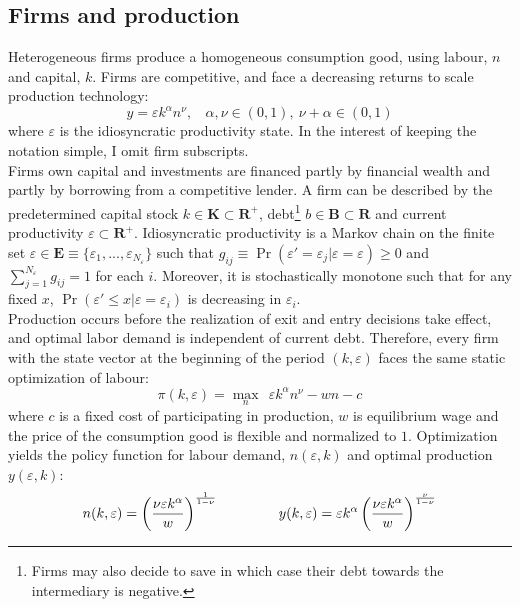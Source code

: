 \documentclass[12pt]{article}
\begin{document}
\subsection{Firms and production \label{sec:production}}
Heterogeneous firms produce a homogeneous consumption good, using labour, $n$ and capital, $k$. Firms are competitive, and face a decreasing returns to scale production technology:
\begin{equation} \label{eq:prodf}
y = \varepsilon k^{\alpha}n^{\nu}, \ \ \ \ \alpha,\nu \in (0,1),  \ \nu + \alpha \in (0,1)
\end{equation}  
where $\varepsilon$ is the idiosyncratic productivity state. In the interest of keeping the notation simple, I omit firm subscripts. \vspace{3mm} \\
Firms own capital and investments are financed partly by financial wealth and partly by borrowing from a competitive lender. A firm can be described by the predetermined capital stock $k \in \mathbf{K} \subset \mathbf{R^{+}}$, debt\footnote{Firms may also decide to save in which case their debt towards the intermediary is negative.} $b \in \mathbf{B} \subset \mathbf{R}$ and current productivity $\varepsilon \subset \mathbf{R^+}$. Idiosyncratic productivity is a Markov chain on the finite set $\varepsilon \in \mathbf{E} \equiv \{ \varepsilon_1,...,\varepsilon_{N_{\varepsilon}} \}$ such that $ g_{ij} \equiv \Pr(\varepsilon'= \varepsilon_j|\varepsilon = \varepsilon) \geq 0$ and $\sum_{j=1}^{N_{\varepsilon}} g_{ij} = 1$ for each $i$. Moreover, it is stochastically monotone such that for any fixed $x$, $\Pr(\varepsilon' \leq x | \varepsilon = \varepsilon_i)$ is decreasing in $\varepsilon_i$. \vspace{3mm} \\
Production occurs before the realization of exit and entry decisions take effect, and optimal labor demand is independent of current debt. Therefore, every firm with the state vector at the beginning of the period $(k,\varepsilon)$ faces the same static optimization of labour: 
$$ \pi(k,\varepsilon) = \max_{n} \ \  \varepsilon k^{\alpha}n^{\nu} - wn - c$$
where $c$ is a fixed cost of participating in production, $w$ is equilibrium wage and the price of the consumption good is flexible and normalized to $1$. Optimization yields the policy function for labour demand, $n(\varepsilon,k)$ and optimal production $y(\varepsilon,k)$: 
\begin{equation} \label{eq:opt_emp_prod}
n(k,\varepsilon) = \left( \dfrac{ \nu \varepsilon k^\alpha}{w} \right)^{\frac{1}{1-\nu}} \hspace{15mm}
y(k,\varepsilon) = \varepsilon k^{\alpha} \left( \dfrac{\nu \varepsilon k^\alpha}{w} \right)^{\frac{\nu}{1-\nu}}
\end{equation}  
\end{document}
